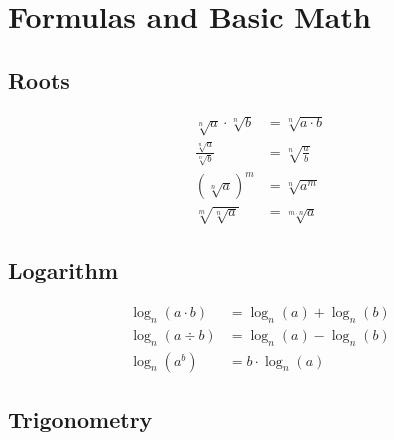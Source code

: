 \section{Formulas and Basic Math}

\subsection{Roots}

\begin{align*}
    \sqrt[n]{a}\cdot\sqrt[n]{b} & = \sqrt[n]{a\cdot b} \\
    \frac{\sqrt[n]{a}}{\sqrt[n]{b}} & = \sqrt[n]{\frac{a}{b}} \\
    (\sqrt[n]{a})^m & = \sqrt[n]{a^m} \\
    \sqrt[m]{\sqrt[n]{a}} & = \sqrt[m\cdot n]{a}
\end{align*}

\subsection{Logarithm}

\begin{align*}
    \log_n(a\cdot b) & = \log_n(a) + \log_n(b) \\
    \log_n(a\div b) & = \log_n(a) - \log_n(b) \\
    \log_n(a^b) & = b \cdot \log_n(a)
\end{align*}

\subsection{Trigonometry}

